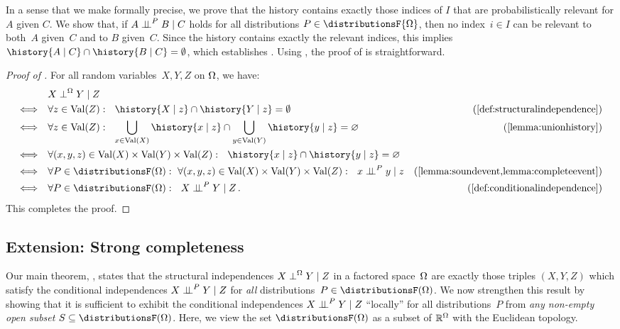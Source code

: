 \documentclass[USenglish,onecolumn]{article}
\begin{document}
In a sense that we make formally precise, we prove that the history contains exactly those indices of $I$ that are probabilistically relevant for $A$ given $C$.
We show that, if $A \mathrel{\perp\!\!\!\perp}^P B \mid C$ holds for all distributions $P\in\distributionsF{\Omg}$, then no index~$i\in I$ can be relevant to both~$A$ given~$C$ and to $B$ given~$C$.
Since the history contains exactly the relevant indices, this implies $\history{A\given C} \cap \history{B\given C} = \emptyset$, which establishes .
Using , the proof of  is straightforward.
\begin{proof}[Proof of ]
For all random variables~$X,Y,Z$ on $\Omega$, we have:
\begin{align*}
  & X \orthF Y \given Z \\
  \Longleftrightarrow \quad
  & \forall z \in \Val(Z): \ \ \history{X \given z} \cap \history{Y \given z} = \emptyset &\text{(\Cref{def:structuralindependence})} \\
  \Longleftrightarrow \quad
  & \forall z \in \Val(Z): \ \ \bigcup_{x\in\Val(X)}\history{x\given z} \cap \bigcup_{y\in\Val(Y)}\history{y\given z} =\nothing & \text{(\Cref{lemma:unionhistory})}\\
  \Longleftrightarrow \quad
  & \forall (x, y, z) \in \Val(X) \times \Val(Y) \times \Val(Z): \ \ \history{x \given z} \cap \history{y \given z} = \nothing \\
  \Longleftrightarrow \quad
  & \forall P \in \distributionsF(\Omg): \ \forall (x, y, z) \in \Val(X) \times \Val(Y) \times \Val(Z): \ \ x \indep^P y \given z & \text{(\Cref{lemma:soundevent,lemma:completeevent})} \\
  \Longleftrightarrow \quad
  & \forall P \in \distributionsF(\Omg): \ \ X \indep^P Y \given Z\,.&\text{(\Cref{def:conditionalindependence})}
  \end{align*}
This completes the proof.
\end{proof}

\subsection{Extension: Strong completeness}

Our main theorem, , states that the structural independences $X \mathrel{\perp}^\Omega Y \mid Z$ in a factored space~$\Omega$ are exactly those triples $(X,Y,Z)$ which satisfy the conditional independences $X \mathrel{\perp\!\!\!\perp}^P Y \mid Z$ for \emph{all} distributions~$P\in\distributionsF(\Omg)$.
We now strengthen this result by showing that it is sufficient to exhibit the conditional independences $X \mathrel{\perp\!\!\!\perp}^P Y \mid Z$ ``locally'' for all distributions~$P$ from \emph{any non-empty open subset $S\subseteq\distributionsF(\Omg)$}.
Here, we view the set $\distributionsF(\Omg)$ as a subset of $\mathbb{R}^\Omega$ with the Euclidean topology.
\end{document}
